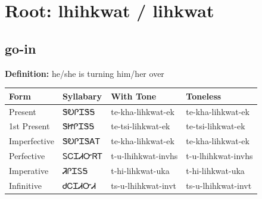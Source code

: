 \documentclass{article}%
\begin{document}
%
\normalsize%
\section*{Root: lhihkwat / lihkwat}%
\subsection*{go-in}%
\textbf{Definition: }%
he/she is turning him/her over%
\\[0.5em]%
\begin{tabular}{|l|l|l|l|}%
\hline%
\textbf{Form}&\textbf{Syllabary}&\textbf{With Tone}&\textbf{Toneless}\\%
\hline%
Present&ᏕᎧᎵᏆᏕᎦ&te{-}kha{-}lihkwat{-}ek&te{-}kha{-}lihkwat{-}ek\\%
1st Present&ᏕᏥᎵᏆᏕᎦ&te{-}tsi{-}lihkwat{-}ek&te{-}tsi{-}lihkwat{-}ek\\%
Imperfective&ᏕᎧᎵᏆᏕᎪᎢ&te{-}kha{-}lihkwat{-}ek&te{-}kha{-}lihkwat{-}ek\\%
Perfective&ᏚᏟᏆᏗᏅᏒᎢ&t{-}u{-}lhihkwat{-}invhs&t{-}u{-}lhihkwat{-}invhs\\%
Imperative&ᏘᎵᏆᏚᎦ&t{-}hi{-}lihkwat{-}uka&t{-}hi{-}lihkwat{-}uka\\%
Infinitive&ᏧᏟᏆᏗᏅᏗ&ts{-}u{-}lhihkwat{-}invt&ts{-}u{-}lhihkwat{-}invt\\%
\hline%
\end{tabular}%
\\[1em]%
\end{document}
